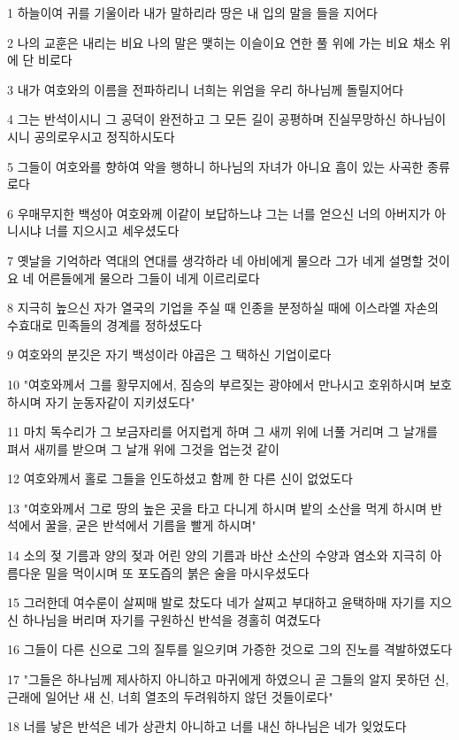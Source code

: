 \par 1 하늘이여 귀를 기울이라 내가 말하리라 땅은 내 입의 말을 들을 지어다
\par 2 나의 교훈은 내리는 비요 나의 말은 맺히는 이슬이요 연한 풀 위에 가는 비요 채소 위에 단 비로다
\par 3 내가 여호와의 이름을 전파하리니 너희는 위엄을 우리 하나님께 돌릴지어다
\par 4 그는 반석이시니 그 공덕이 완전하고 그 모든 길이 공평하며 진실무망하신 하나님이시니 공의로우시고 정직하시도다
\par 5 그들이 여호와를 향하여 악을 행하니 하나님의 자녀가 아니요 흠이 있는 사곡한 종류로다
\par 6 우매무지한 백성아 여호와께 이같이 보답하느냐 그는 너를 얻으신 너의 아버지가 아니시냐 너를 지으시고 세우셨도다
\par 7 옛날을 기억하라 역대의 연대를 생각하라 네 아비에게 물으라 그가 네게 설명할 것이요 네 어른들에게 물으라 그들이 네게 이르리로다
\par 8 지극히 높으신 자가 열국의 기업을 주실 때 인종을 분정하실 때에 이스라엘 자손의 수효대로 민족들의 경계를 정하셨도다
\par 9 여호와의 분깃은 자기 백성이라 야곱은 그 택하신 기업이로다
\par 10 "여호와께서 그를 황무지에서, 짐승의 부르짖는 광야에서 만나시고 호위하시며 보호하시며 자기 눈동자같이 지키셨도다"
\par 11 마치 독수리가 그 보금자리를 어지럽게 하며 그 새끼 위에 너풀 거리며 그 날개를 펴서 새끼를 받으며 그 날개 위에 그것을 업는것 같이
\par 12 여호와께서 홀로 그들을 인도하셨고 함께 한 다른 신이 없었도다
\par 13 "여호와께서 그로 땅의 높은 곳을 타고 다니게 하시며 밭의 소산을 먹게 하시며 반석에서 꿀을, 굳은 반석에서 기름을 빨게 하시며"
\par 14 소의 젖 기름과 양의 젖과 어린 양의 기름과 바산 소산의 수양과 염소와 지극히 아름다운 밀을 먹이시며 또 포도즙의 붉은 술을 마시우셨도다
\par 15 그러한데 여수룬이 살찌매 발로 찼도다 네가 살찌고 부대하고 윤택하매 자기를 지으신 하나님을 버리며 자기를 구원하신 반석을 경홀히 여겼도다
\par 16 그들이 다른 신으로 그의 질투를 일으키며 가증한 것으로 그의 진노를 격발하였도다
\par 17 "그들은 하나님께 제사하지 아니하고 마귀에게 하였으니 곧 그들의 알지 못하던 신, 근래에 일어난 새 신, 너희 열조의 두려워하지 않던 것들이로다"
\par 18 너를 낳은 반석은 네가 상관치 아니하고 너를 내신 하나님은 네가 잊었도다
